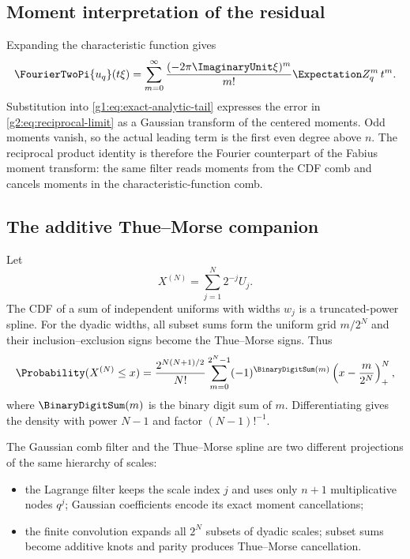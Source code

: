 \subsection{Moment interpretation of the residual}

Expanding the characteristic function gives
\begin{equation}
 \FourierTwoPi{u_q}(t\xi)
 =\sum_{m=0}^\infty
 \frac{(-2\pi\ImaginaryUnit\xi)^m}{m!}\Expectation Z_q^m\,t^m.
 \label{g2:eq:uq-characteristic-series}
\end{equation}
Substitution into \eqref{g1:eq:exact-analytic-tail} expresses the error in
\eqref{g2:eq:reciprocal-limit} as a Gaussian transform of the centered moments.
Odd moments vanish, so the actual leading term is the first even degree above
$n$.  The reciprocal product identity is therefore the Fourier counterpart of
the Fabius moment transform: the same filter reads moments from the CDF comb
and cancels moments in the characteristic-function comb.


\subsection{The additive Thue--Morse companion}

Let
\begin{equation}
 X^{(N)}=\sum_{j=1}^N2^{-j}U_j.
 \label{g2:eq:finite-dyadic-sum}
\end{equation}
The CDF of a sum of independent uniforms with widths $w_j$ is a truncated-power
spline.  For the dyadic widths, all subset sums form the uniform grid
$m/2^N$ and their inclusion--exclusion signs become the Thue--Morse signs.
Thus
\begin{equation}
 \Probability(X^{(N)}\le x)
 =\frac{2^{N(N+1)/2}}{N!}
 \sum_{m=0}^{2^N-1}(-1)^{\BinaryDigitSum(m)}
 \left(x-\frac{m}{2^N}\right)_+^N,
 \label{g2:eq:thue-morse-spline-cdf}
\end{equation}
where $\BinaryDigitSum(m)$ is the binary digit sum of $m$.  Differentiating gives the density with
power $N-1$ and factor $(N-1)!^{-1}$.

The Gaussian comb filter and the Thue--Morse spline are two different
projections of the same hierarchy of scales:

\begin{itemize}
\item the Lagrange filter keeps the scale index $j$ and uses only $n+1$
      multiplicative nodes $q^j$; Gaussian coefficients encode its exact
      moment cancellations;
\item the finite convolution expands all $2^N$ subsets of dyadic scales;
      subset sums become additive knots and parity produces Thue--Morse
      cancellation.
\end{itemize}

